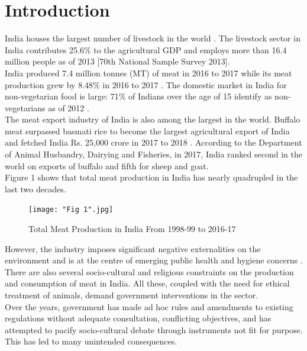 \documentclass[a4paper, 12pt]{article}
\begin{document}
\newpage
\section{Introduction}
India houses the largest number of livestock in the world \parencite{sharmanews}. The livestock sector in India contributes 25.6\% to the agricultural GDP and employs more than 16.4 million people as of 2013 [70th National Sample Survey 2013].\\

India produced 7.4 million tonnes (MT) of meat in 2016 to 2017 \parencite{dahreport} while its meat production grew by 8.48\% in 2016 to 2017 \parencite{dah1report}. The domestic market in India for non-vegetarian food is large: 71\% of Indians over the age of 15 identify as non-vegetarians as of 2012 \parencite{mspireport}. \\

The meat export industry of India is also among the largest in the world. Buffalo meat surpassed basmati rice to become the largest agricultural export of India and fetched India Rs. 25,000 crore in 2017 to 2018 \parencite{apedastats}. According to the Department of Animal Husbandry, Dairying and Fisheries, in 2017, India ranked second in the world on exports of buffalo and fifth for sheep and goat.\\ 

Figure 1 shows that total meat production in India has nearly quadrupled in the last two decades.\\

\begin{figure}[H]
\centering
\texttt{[image: "Fig 1".jpg]}
\caption{Total Meat Production in India From 1998-99 to 2016-17 \parencite{cmiestats}}
\end{figure}

However, the industry imposes significant negative externalities on the environment and is at the centre of emerging public health and hygiene concerns \parencite{praderepaper}. There are also several socio-cultural and religious constraints on the production and consumption of meat in India. All these, coupled with the need for ethical treatment of animals, demand government interventions in the sector. \\

Over the years, government has made ad hoc rules and amendments to existing regulations without adequate consultation, conflicting objectives, and has attempted to pacify socio-cultural debate through instruments not fit for purpose. This has led to many unintended consequences.\\
\end{document}

